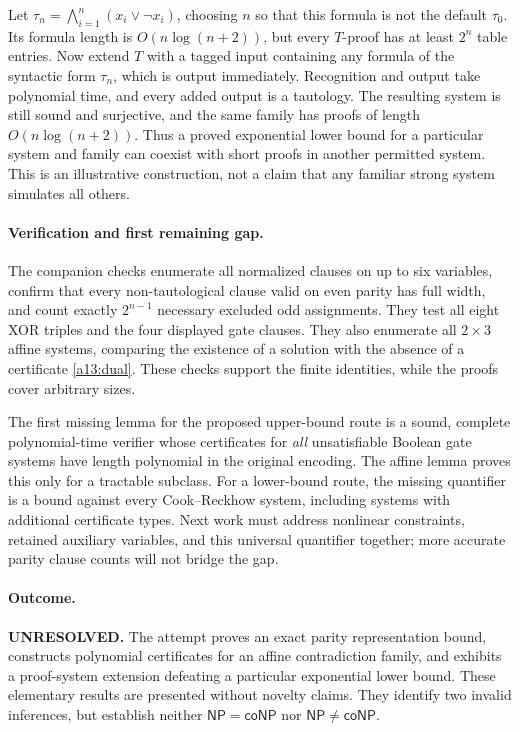 \documentclass[11pt]{article}
\begin{document}
Let $\tau_n=\bigwedge_{i=1}^n(x_i\vee\neg x_i)$, choosing $n$ so that this
formula is not the default $\tau_0$. Its formula length is
$O(n\log(n+2))$, but every $T$-proof has at least $2^n$ table entries. Now
extend $T$ with a tagged input containing any formula of the syntactic form
$\tau_n$, which is output immediately. Recognition and output take
polynomial time, and every added output is a tautology. The resulting system
is still sound and surjective, and the same family has proofs of length
$O(n\log(n+2))$. Thus a proved exponential lower bound for a particular
system and family can coexist with short proofs in another permitted system.
This is an illustrative construction, not a claim that any familiar strong
system simulates all others.

\paragraph{Verification and first remaining gap.}
The companion checks enumerate all normalized clauses on up to six variables,
confirm that every non-tautological clause valid on even parity has full
width, and count exactly $2^{n-1}$ necessary excluded odd assignments.
They test all eight XOR triples and the four displayed gate clauses.
They also enumerate all $2\times3$ affine systems, comparing the existence
of a solution with the absence of a certificate \eqref{a13:dual}. These
checks support the finite identities, while the proofs cover arbitrary sizes.

The first missing lemma for the proposed upper-bound route is a sound,
complete polynomial-time verifier whose certificates for \emph{all}
unsatisfiable Boolean gate systems have length polynomial in the original
encoding. The affine lemma proves this only for a tractable subclass. For
a lower-bound route, the missing quantifier is a bound against every
Cook--Reckhow system, including systems with additional certificate types.
Next work must address nonlinear constraints, retained auxiliary variables,
and this universal quantifier together; more accurate parity clause counts
will not bridge the gap.

\paragraph{Outcome.}
\textbf{UNRESOLVED.} The attempt proves an exact parity representation bound,
constructs polynomial certificates for an affine contradiction family, and
exhibits a proof-system extension defeating a particular exponential lower
bound. These elementary results are presented without novelty claims. They
identify two invalid inferences, but establish neither
$\mathsf{NP}=\mathsf{coNP}$ nor $\mathsf{NP}\ne\mathsf{coNP}$.
\end{document}
